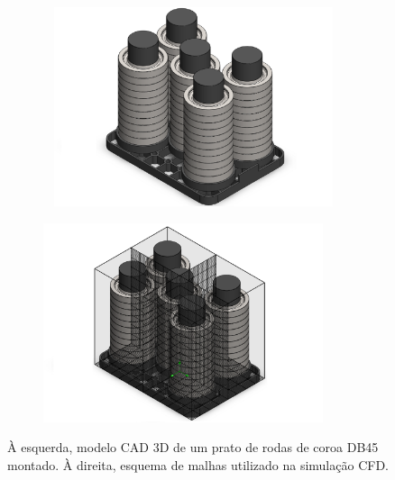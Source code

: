 \begin{figure}[htb]
    \centering
    \begin{subfigure}{.5\textwidth}\
        \centering
        \includegraphics[width = 0.9\textwidth]{Figures/Cap3/Prato_montado.png}
        \caption{}
        \label{fig:modelo_montado}
    \end{subfigure}%
    \begin{subfigure}{.5\textwidth}
        \centering
        \includegraphics[width = 0.9\textwidth]{Figures/Cap3/Prato_montado_malha.png}
        \caption{}
        \label{fig:malha_simulacao}
    \end{subfigure}
    \caption[Modelo 3D de um prato montado e esquema de malhas da simulação.]%
    {À esquerda, modelo CAD 3D de um prato de rodas de coroa DB45 montado. À direita, esquema de malhas utilizado na simulação CFD.}
\end{figure}
